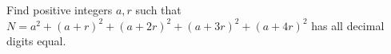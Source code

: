 Find positive integers $a,r$ such that $N=a^2+(a+r)^2+(a+2r)^2+(a+3r)^2+(a+4r)^2$ has all decimal digits equal.
